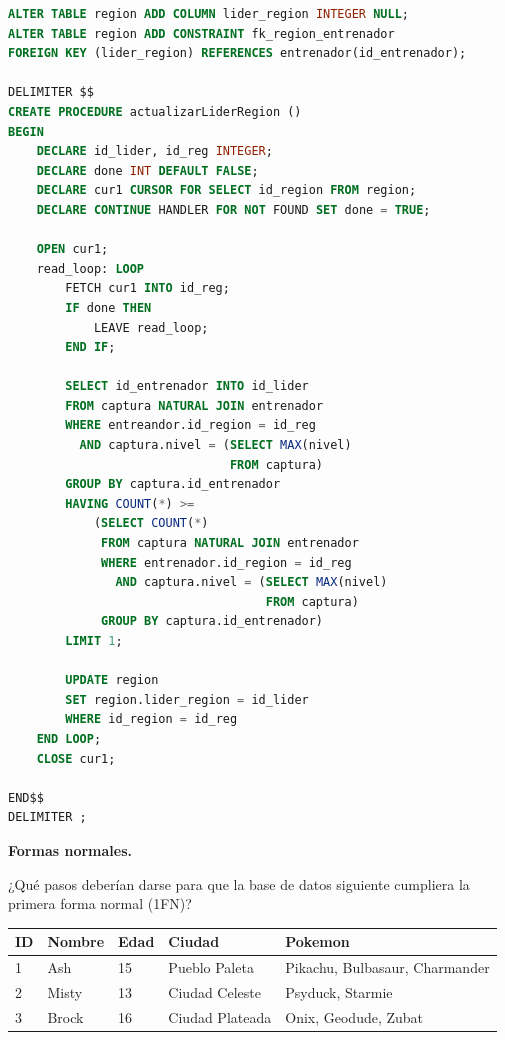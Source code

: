 \documentclass[
    12pt,
    a4paper,
    addpoints,
    answers,
    convocatoria=ord,
    titulacion=NoCD,
    curso=2023/2024,
]{db-exam}
\begin{document}
\begin{questions}
\begin{solution}
\begin{lstlisting}[language=SQL]
ALTER TABLE region ADD COLUMN lider_region INTEGER NULL;
ALTER TABLE region ADD CONSTRAINT fk_region_entrenador
FOREIGN KEY (lider_region) REFERENCES entrenador(id_entrenador);

DELIMITER $$
CREATE PROCEDURE actualizarLiderRegion ()
BEGIN
    DECLARE id_lider, id_reg INTEGER;
    DECLARE done INT DEFAULT FALSE;
    DECLARE cur1 CURSOR FOR SELECT id_region FROM region;
    DECLARE CONTINUE HANDLER FOR NOT FOUND SET done = TRUE;
    
    OPEN cur1;
    read_loop: LOOP
        FETCH cur1 INTO id_reg;
        IF done THEN
            LEAVE read_loop;
        END IF;
        
        SELECT id_entrenador INTO id_lider
        FROM captura NATURAL JOIN entrenador 
        WHERE entreandor.id_region = id_reg 
          AND captura.nivel = (SELECT MAX(nivel) 
                               FROM captura)
        GROUP BY captura.id_entrenador
        HAVING COUNT(*) >= 
            (SELECT COUNT(*) 
             FROM captura NATURAL JOIN entrenador 
             WHERE entrenador.id_region = id_reg 
               AND captura.nivel = (SELECT MAX(nivel) 
                                    FROM captura)
             GROUP BY captura.id_entrenador)
        LIMIT 1;
        
        UPDATE region
        SET region.lider_region = id_lider
        WHERE id_region = id_reg
    END LOOP;
    CLOSE cur1;
    
END$$
DELIMITER ;
\end{lstlisting}
\end{solution}

\newpage
\question[\half] \textbf{Formas normales.}

¿Qué pasos deberían darse para que la base de datos siguiente cumpliera la primera forma normal (1FN)?
    
\vspace{1em}

\begin{tabular}{lllll}
\hline
ID & Nombre & Edad & Ciudad & Pokemon \\
\hline
1 & Ash & 15 & Pueblo Paleta & Pikachu, Bulbasaur, Charmander \\
2 & Misty & 13 & Ciudad Celeste & Psyduck, Starmie \\
3 & Brock & 16 & Ciudad Plateada & Onix, Geodude, Zubat \\
\hline
\end{tabular}  


\end{questions}
\end{document}
